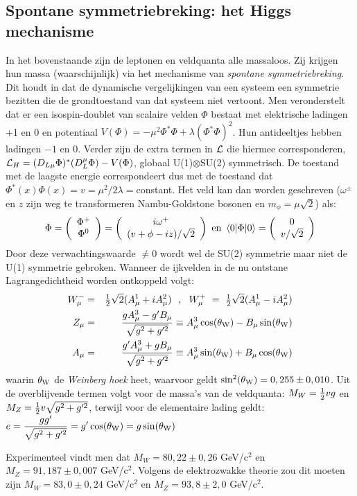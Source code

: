\documentclass[twoside]{report}
\begin{document}
\subsection[~~Spontane symmetriebreking: het Higgs mechanisme]{Spontane symmetriebreking: het Higgs mechanisme}
In het bovenstaande zijn de leptonen en veldquanta alle massaloos. Zij
krijgen hun massa (waarschijnlijk) via het mechanisme van {\it spontane
symmetriebreking}. Dit houdt in dat de dynamische vergelijkingen van een
systeem een symmetrie bezitten die de grondtoestand van dat systeem niet
vertoont. Men veronderstelt dat er een isospin-doublet van scalaire velden
$\Phi$ bestaat met elektrische ladingen +1 en 0 en potentiaal
$V(\Phi)=-\mu^2\Phi^*\Phi+\lambda(\Phi^*\Phi)^2$. Hun antideeltjes hebben
ladingen $-1$ en 0. Verder zijn de extra termen in ${\cal L}$ die hiermee
corresponderen, ${\cal L}_H=(D_{L\mu}\Phi)^*(D_L^\mu\Phi)-V(\Phi)$, globaal
U(1)$\otimes$SU(2) symmetrisch. De toestand met de laagste energie
correspondeert dus met de toestand dat $\Phi^*(x)\Phi(x)=v=\mu^2/2\lambda=$constant.
Het veld kan dan worden geschreven ($\omega^\pm$ en $z$ zijn weg te
transformeren Nambu-Goldstone bosonen en $m_\phi=\mu\sqrt{2}$) als:
\[
\Phi=\left(\begin{array}{c}\Phi^+\\ \Phi^0\end{array}\right)=
\left(\begin{array}{c}i\omega^+\\ (v+\phi-iz)/\sqrt{2}\end{array}\right)\mbox{~en~}
\left\langle 0|\Phi|0 \right\rangle=\left(\begin{array}{c}0\\ v/\sqrt{2}\end{array}\right)
\]
Door deze verwachtingswaarde $\neq0$ wordt wel de SU(2) symmetrie maar niet
de U(1) symmetrie gebroken. Wanneer de ijkvelden in de nu ontstane
Lagrangedichtheid worden ontkoppeld volgt:
\begin{eqnarray*}
W_\mu^-&=&\mbox{$\frac{1}{2}$}\sqrt{2}(A_\mu^1+iA_\mu^2)~~,~~W_\mu^+~=~\mbox{$\frac{1}{2}$}\sqrt{2}(A_\mu^1-iA_\mu^2)\\
Z_\mu&=&\frac{gA_\mu^3-g'B_\mu}{\sqrt{g^2+g'^2}}\equiv A_\mu^3\cos(\theta_{\rm W})-B_\mu\sin(\theta_{\rm W})\\
A_\mu&=&\frac{g'A_\mu^3+gB_\mu}{\sqrt{g^2+g'^2}}\equiv A_\mu^3\sin(\theta_{\rm W})+B_\mu\cos(\theta_{\rm W})
\end{eqnarray*}
waarin $\theta_{\rm W}$ de {\it Weinberg hoek} heet, waarvoor geldt
$\sin^2(\theta_{\rm W})=0,255\pm0,010$. Uit de overblijvende termen volgt
voor de massa's van de veldquanta: $M_W=\mbox{$\frac{1}{2}$} vg$ en
$M_Z=\mbox{$\frac{1}{2}$} v\sqrt{g^2+g'^2}$, terwijl voor de elementaire lading geldt:
$\displaystyle e=\frac{gg'}{\sqrt{g^2+g'^2}}=g'\cos(\theta_{\rm W})=g\sin(\theta_{\rm W})$
\par
Experimenteel vindt men dat $M_W=80,22\pm0,26$ GeV/c$^2$ en $M_Z=91,187\pm0,007$
GeV/c$^2$. Volgens de elektrozwakke theorie zou dit moeten zijn
$M_W=83,0\pm0,24$ GeV/c$^2$ en $M_Z=93,8\pm2,0$ GeV/c$^2$.
\end{document}
